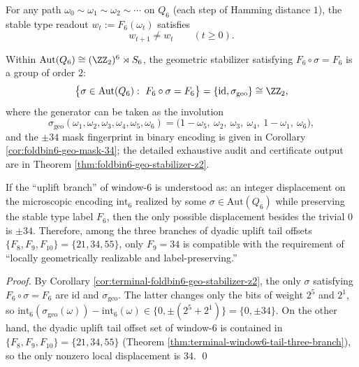 \begin{enumerate}
  \begin{corollary}\label{cor:terminal-foldbin6-no-dwell}
  For any path \(\omega_0\sim \omega_1\sim\omega_2\sim\cdots\) on \(Q_6\) (each step of Hamming distance \(1\)), the stable type readout \(w_t:=F_6(\omega_t)\) satisfies
  \[
  w_{t+1}\neq w_t\qquad (t\ge 0).
  \]
  \end{corollary}

  \begin{corollary}\label{cor:terminal-foldbin6-geo-stabilizer-z2}
  Within \(\mathrm{Aut}(Q_6)\cong (\ZZ_2)^6\rtimes S_6\), the geometric stabilizer satisfying \(F_6\circ\sigma=F_6\) is a group of order \(2\):
  \[
  \bigl\{\sigma\in\mathrm{Aut}(Q_6):\ F_6\circ\sigma=F_6\bigr\}=\{\mathrm{id},\sigma_{\mathrm{geo}}\}\cong \ZZ_2,
  \]
  where the generator can be taken as the involution
  \[
  \sigma_{\mathrm{geo}}(\omega_1,\omega_2,\omega_3,\omega_4,\omega_5,\omega_6)=\bigl(1-\omega_5,\ \omega_2,\ \omega_3,\ \omega_4,\ 1-\omega_1,\ \omega_6\bigr),
  \]
  and the \(\pm 34\) mask fingerprint in binary encoding is given in Corollary \ref{cor:foldbin6-geo-mask-34}; the detailed exhaustive audit and certificate output are in Theorem \ref{thm:foldbin6-geo-stabilizer-z2}.
  \end{corollary}

  \begin{corollary}[Geometric realizability criterion: the uplift \texorpdfstring{$\delta$}{delta}-branch of window-\(6\) admits only \texorpdfstring{$\delta=34$}{delta=34}]\label{cor:terminal-window6-local-uplift-admissibility}
  If the ``uplift branch'' of window-\(6\) is understood as: an integer displacement on the microscopic encoding \(\mathrm{int}_6\) realized by some \(\sigma\in\mathrm{Aut}(Q_6)\) while preserving the stable type label \(F_6\),
  then the only possible displacement besides the trivial \(0\) is \(\pm 34\).
  Therefore, among the three branches of dyadic uplift tail offsets \(\{F_8,F_9,F_{10}\}=\{21,34,55\}\), only \(F_9=34\) is compatible with the requirement of ``locally geometrically realizable and label-preserving.''
  \end{corollary}
  \begin{proof}
  By Corollary \ref{cor:terminal-foldbin6-geo-stabilizer-z2}, the only \(\sigma\) satisfying \(F_6\circ\sigma=F_6\) are \(\mathrm{id}\) and \(\sigma_{\mathrm{geo}}\).
  The latter changes only the bits of weight \(2^5\) and \(2^1\), so
  \(
  \mathrm{int}_6(\sigma_{\mathrm{geo}}(\omega))-\mathrm{int}_6(\omega)\in\{0,\pm(2^5+2^1)\}=\{0,\pm 34\}
  \).
  On the other hand, the dyadic uplift tail offset set of window-\(6\) is contained in \(\{F_8,F_9,F_{10}\}=\{21,34,55\}\) (Theorem \ref{thm:terminal-window6-tail-three-branch}), so the only nonzero local displacement is \(34\). \qed
  \end{proof}


\end{enumerate}
